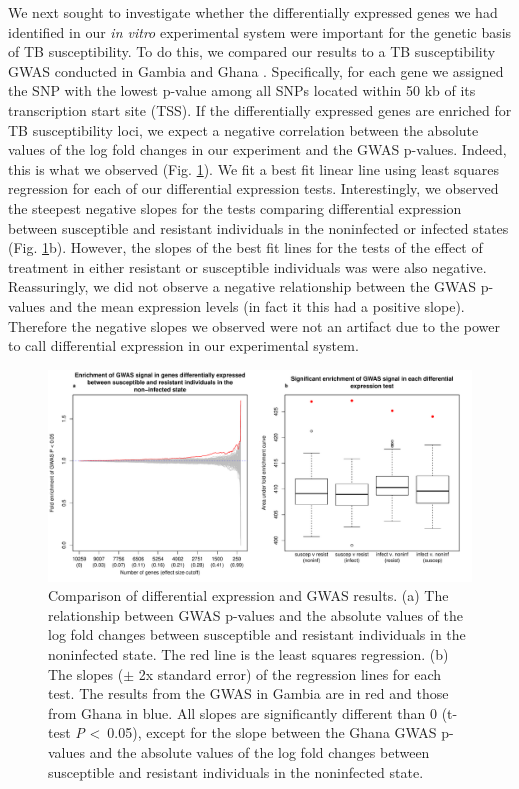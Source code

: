 \documentclass[fleqn,10pt]{wlscirep}
\begin{document}
We next sought to investigate whether the differentially expressed
genes we had identified in our \emph{in vitro} experimental system
were important for the genetic basis of TB susceptibility. To do this,
we compared our results to a TB susceptibility GWAS conducted in
Gambia and Ghana \cite{Thye2010}. Specifically, for each gene we
assigned the SNP with the lowest p-value among all SNPs located within
50 kb of its transcription start site (TSS). If the differentially
expressed genes are enriched for TB susceptibility loci, we expect a
negative correlation between the absolute values of the log fold
changes in our experiment and the GWAS p-values. Indeed, this is what
we observed (Fig. \ref{fig:gwas}). We fit a best fit linear line using
least squares regression for each of our differential expression
tests. Interestingly, we observed the steepest negative slopes for the
tests comparing differential expression between susceptible and
resistant individuals in the noninfected or infected states (Fig.
\ref{fig:gwas}b). However, the slopes of the best fit lines for the
tests of the effect of treatment in either resistant or susceptible
individuals was were also negative. Reassuringly, we did not observe a
negative relationship between the GWAS p-values and the mean
expression levels (in fact it this had a positive slope). Therefore
the negative slopes we observed were not an artifact due to the power
to call differential expression in our experimental system.

\begin{figure}[ht]
\centering
\includegraphics[width=\linewidth]{../figure/gwas.pdf}
\caption{
Comparison of differential expression and GWAS results. (a) The
relationship between GWAS p-values \cite{Thye2010} and the absolute
values of the log fold changes between susceptible and resistant
individuals in the noninfected state. The red line is the least
squares regression. (b) The slopes ($\pm$ 2x standard error) of the
regression lines for each test. The results from the GWAS in Gambia
are in red and those from Ghana in blue. All slopes are significantly
different than 0 (t-test \emph{P} \textless \, 0.05), except for the
slope between the Ghana GWAS p-values and the absolute values of the
log fold changes between susceptible and resistant individuals in the
noninfected state.
}
\label{fig:gwas}
\end{figure}
\end{document}
